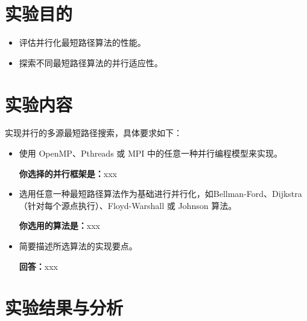 \documentclass{SYSUReport}
\date{2025年5月14日}
\begin{document}
\cover
\thispagestyle{empty} %
\clearpage



\section{实验目的}
\begin{itemize}
    \item 评估并行化最短路径算法的性能。
    \item 探索不同最短路径算法的并行适应性。
\end{itemize}
\section{实验内容}
实现并行的多源最短路径搜索，具体要求如下：
\begin{itemize}
    \item 使用 OpenMP、Pthreads 或 MPI 中的任意一种并行编程模型来实现。

 \textbf{你选择的并行框架是：}xxx
    \item 选用任意一种最短路径算法作为基础进行并行化，如Bellman-Ford、Dijkstra（针对每个源点执行）、Floyd-Warshall 或 Johnson 算法。
    
\textbf{你选用的算法是：}xxx
\item 简要描述所选算法的实现要点。

\textbf{回答：}xxx
\end{itemize}
\section{实验结果与分析}
\end{document}
